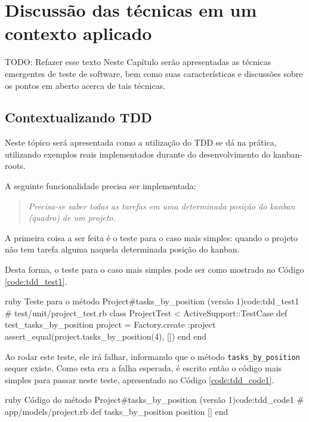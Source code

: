 \chapter{Discussão das técnicas em um contexto aplicado}

TODO: Refazer esse texto
Neste Capítulo serão apresentadas as técnicas emergentes de teste de software, bem como suas características e discussões sobre os pontos em aberto acerca de tais técnicas.

\section{Contextualizando TDD}
\label{sec:contextualizando_tdd}

Neste tópico será apresentada como a utilização do TDD se dá na prática, utilizando exemplos reais implementados durante do desenvolvimento do kanban-roots.

A seguinte funcionalidade precisa ser implementada:

\begin{quote}
\textit{Precisa-se saber todas as tarefas em uma determinada posição do kanban (quadro) de um projeto.}
\end{quote}

A primeira coisa a ser feita é o teste para o caso mais simples: quando o projeto não tem tarefa alguma naquela determinada posição do kanban.

Desta forma, o teste para o caso mais simples pode ser como mostrado no Código \ref{code:tdd_test1}.

\begin{mycode}{ruby}%
{Teste para o método Project\#tasks\_by\_position (versão 1)}{code:tdd_test1}
# test/unit/project_test.rb
class ProjectTest < ActiveSupport::TestCase
  def test_tasks_by_position
    project = Factory.create :project
    assert_equal(project.tasks_by_position(4), [])
  end
end
\end{mycode}

Ao rodar este teste, ele irá falhar, informando que o método \texttt{tasks\_by\_position} sequer existe. Como esta era a falha esperada, é escrito então o código mais simples para passar neste teste, apresentado no Código \ref{code:tdd_code1}.

\begin{mycode}{ruby}%
{Código do método Project\#tasks\_by\_position (versão 1)}{code:tdd_code1}
# app/models/project.rb
def tasks_by_position position
  []
end
\end{mycode}

